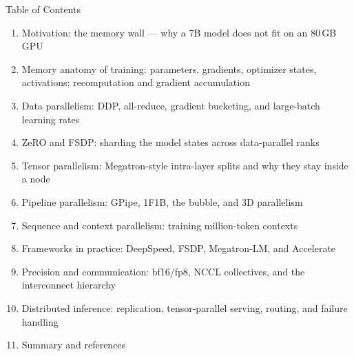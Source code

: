 \begin{frame}[allowframebreaks]{Table of Contents}
  \begin{enumerate}\itemsep0.15em
    \item Motivation: the memory wall --- why a 7B model does not fit on an 80\,GB GPU
    \item Memory anatomy of training: parameters, gradients, optimizer states, activations; recomputation and gradient accumulation
    \item Data parallelism: DDP, all-reduce, gradient bucketing, and large-batch learning rates
    \item ZeRO and FSDP: sharding the model states across data-parallel ranks
    \item Tensor parallelism: Megatron-style intra-layer splits and why they stay inside a node
    \item Pipeline parallelism: GPipe, 1F1B, the bubble, and 3D parallelism
    \item Sequence and context parallelism: training million-token contexts
    \item Frameworks in practice: DeepSpeed, FSDP, Megatron-LM, and Accelerate
    \item Precision and communication: bf16/fp8, NCCL collectives, and the interconnect hierarchy
    \item Distributed inference: replication, tensor-parallel serving, routing, and failure handling
    \item Summary and references
  \end{enumerate}
\end{frame}
